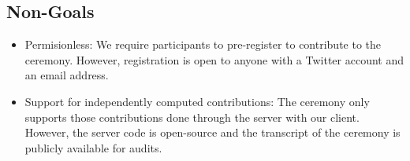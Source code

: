 \subsection{Non-Goals}

\begin{itemize}
    \item Permisionless: We require participants to pre-register to contribute to the ceremony. However, registration is open to anyone with a Twitter account and an email address.
    \item Support for independently computed contributions: The ceremony only supports those contributions done through the server with our client. However, the server code is open-source and the transcript of the ceremony is publicly available for audits.
\end{itemize}